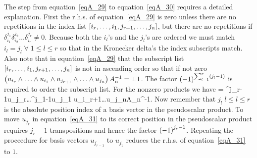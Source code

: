 The step from equation~\ref{eqA_29} to equation~\ref{eqA_30} requires a detailed explanation.  First the r.h.s. of equation~\ref{eqA_29} is zero unless there are no
repetitions in the index list $\left [ {i_{r},\dots,i_{1},j_{r+1},\dots,j_{n}} \right ]$, but there are no repetitions if 
$\delta_{i_{1}}^{j_{1}}\delta_{i_{2}}^{j_{2}}\dots\delta_{i_{r}}^{j_{r}} \ne 0$. Because both the $i_{l}$'s and the $j_{l}$'s are ordered we must match 
$i_{l} = j_{l}\;\forall\;1\le l\le r$ so that in the Kronecker delta's the index subscripts match.  Also note that in equation~\ref{eqA_29} that the subscript list
$\left [ {i_{r},\dots,i_{1},j_{r+1},\dots,j_{n}} \right ]$ is not in ascending order so that if not zero $\paren{u_{i_{r}}\W\dots\W u_{i_{1}}\W u_{j_{r+1}}\W\dots\W u_{j_{n}}}A_{n}^{-1} = \pm 1$.
The factor $\left ( {-1} \right )^{\sum_{l=1}^{r}\left ( {j_{l}-1} \right )}$ is required to order the subscript list.  For the nonzero products we have
\be
	\cdot{} = ^{j_{r}-1}u_{j_{r}}\W\dots\W {}^{j_{1}-1}u_{j_{1}}\W 
	                                                                                u_{i_{r+1}}\W\dots\W u_{j_{n}}A_{n}^{-1}. \label{eqA_31}
\ee
Now remember that $j_{l}\; l\le l\le r$ is the absolute position index of a basis vector in the pseudoscalar product.  To move $u_{j_{r}}$ in equation~\ref{eqA_31}
to its correct position in the pseudoscalar product requires $j_{r}-1$ transpositions and hence the factor $\left ( {-1} \right )^{j_{r}-1}$.  Repeating the proceedure for
basis vectors $u_{j_{r-1}}$ to $u_{j_{1}}$ reduces the r.h.s. of equation~\ref{eqA_31} to $1$.



